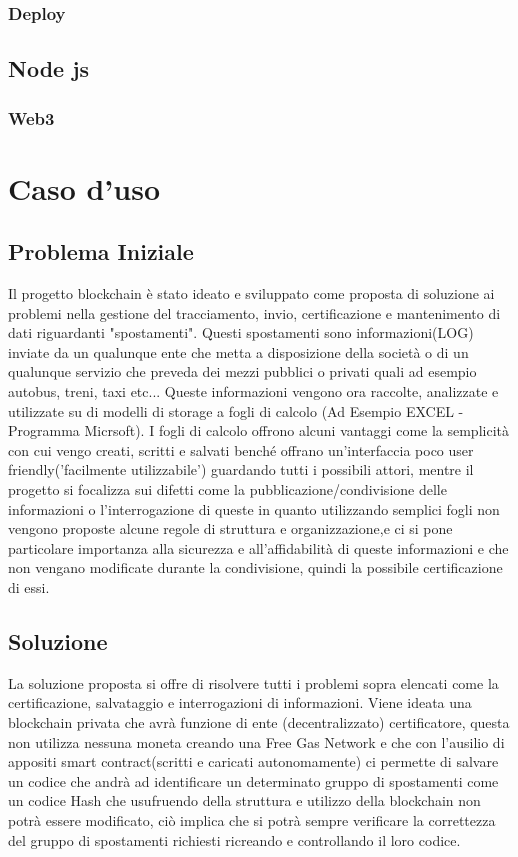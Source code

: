 \documentclass[12pt]{report}
\begin{document}
\subsection{Deploy}
\section{Node js}
\subsection{Web3}

\chapter{Caso d'uso}
\section{Problema Iniziale}
Il progetto blockchain è stato ideato e sviluppato come proposta di soluzione ai problemi nella gestione del tracciamento, invio, certificazione e mantenimento di dati riguardanti "spostamenti". Questi spostamenti sono informazioni(LOG) inviate da un qualunque ente che metta a disposizione della società o di un qualunque servizio che preveda dei mezzi pubblici o privati quali ad esempio autobus, treni, taxi etc... Queste informazioni vengono ora raccolte, analizzate e utilizzate su di modelli di storage a fogli di calcolo (Ad Esempio EXCEL - Programma Micrsoft). I fogli di calcolo offrono alcuni vantaggi come la semplicità con cui vengo creati, scritti e salvati benché offrano un'interfaccia poco user friendly('facilmente utilizzabile') guardando tutti i possibili attori, mentre il progetto si focalizza sui difetti come la pubblicazione/condivisione delle informazioni o l'interrogazione di queste in quanto utilizzando semplici fogli non vengono proposte alcune regole di struttura e organizzazione,e ci si pone particolare importanza alla sicurezza e all'affidabilità di queste informazioni e che non vengano modificate durante la condivisione, quindi la possibile certificazione di essi.

\section{Soluzione}
La soluzione proposta si offre di risolvere tutti i problemi sopra elencati come la certificazione, salvataggio e interrogazioni di informazioni. Viene ideata una blockchain privata che avrà funzione di ente (decentralizzato) certificatore, questa non utilizza nessuna moneta creando una Free Gas Network e che con l'ausilio di appositi smart contract(scritti e caricati autonomamente) ci permette di salvare un codice che andrà ad identificare un determinato gruppo di spostamenti come un codice Hash che usufruendo della struttura e utilizzo della blockchain non potrà essere modificato, ciò implica che si potrà sempre verificare la correttezza del gruppo di spostamenti richiesti ricreando e controllando il loro codice.
\end{document}
